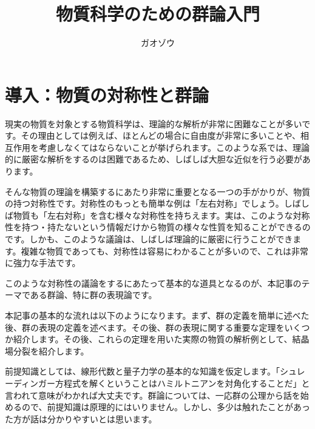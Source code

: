 \documentclass[uplatex,dvipdfmx,a4j,openany]{jsarticle}
\title{物質科学のための群論入門}
\author{ガオゾウ}
\begin{document}
\maketitle
\section{導入：物質の対称性と群論}
現実の物質を対象とする物質科学は、理論的な解析が非常に困難なことが多いです。その理由としては例えば、ほとんどの場合に自由度が非常に多いことや、相互作用を考慮しなくてはならないことが挙げられます。このような系では、理論的に厳密な解析をするのは困難であるため、しばしば大胆な近似を行う必要があります。

そんな物質の理論を構築するにあたり非常に重要となる一つの手がかりが、物質の持つ対称性です。対称性のもっとも簡単な例は「左右対称」でしょう。しばしば物質も「左右対称」を含む様々な対称性を持ちえます。実は、このような対称性を持つ・持たないという情報だけから物質の様々な性質を知ることができるのです。しかも、このような議論は、しばしば理論的に厳密に行うことができます。複雑な物質であっても、対称性は容易にわかることが多いので、これは非常に強力な手法です。



このような対称性の議論をするにあたって基本的な道具となるのが、本記事のテーマである群論、特に群の表現論です。

本記事の基本的な流れは以下のようになります。まず、群の定義を簡単に述べた後、群の表現の定義を述べます。その後、群の表現に関する重要な定理をいくつか紹介します。その後、これらの定理を用いた実際の物質の解析例として、結晶場分裂を紹介します。

前提知識としては、線形代数と量子力学の基本的な知識を仮定します。「シュレーディンガー方程式を解くということはハミルトニアンを対角化することだ」と言われて意味がわかれば大丈夫です。群論については、一応群の公理から話を始めるので、前提知識は原理的にはいりません。しかし、多少は触れたことがあった方が話は分かりやすいとは思います。
\end{document}
